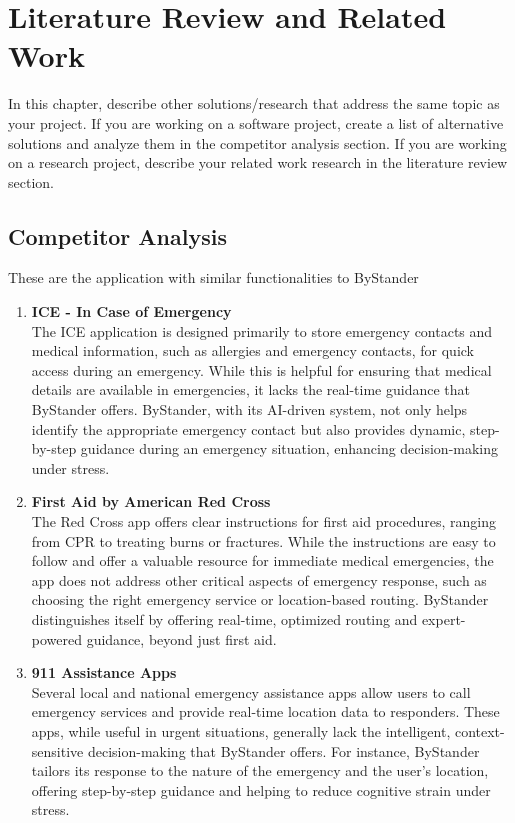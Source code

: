 \chapter{Literature Review and Related Work}
\label{chap:relatedworks}

In this chapter, describe other solutions/research that address the
same topic as your project. If you are working on a software project, create a
list of alternative solutions and analyze them in the competitor analysis section.
If you are working on a research project, describe your related work research in
the literature review section.

\section{Competitor Analysis}
\label{section:competitor-analysis}


These are the application with similar functionalities to ByStander

\begin{enumerate}
    \item \textbf{ICE - In Case of Emergency} \\
    The ICE application is designed primarily to store emergency contacts and medical information, such as allergies and emergency contacts, for quick access during an emergency. While this is helpful for ensuring that medical details are available in emergencies, it lacks the real-time guidance that ByStander offers. ByStander, with its AI-driven system, not only helps identify the appropriate emergency contact but also provides dynamic, step-by-step guidance during an emergency situation, enhancing decision-making under stress.    
    \item \textbf{First Aid by American Red Cross} \\
    The Red Cross app offers clear instructions for first aid procedures, ranging from CPR to treating burns or fractures. While the instructions are easy to follow and offer a valuable resource for immediate medical emergencies, the app does not address other critical aspects of emergency response, such as choosing the right emergency service or location-based routing. ByStander distinguishes itself by offering real-time, optimized routing and expert-powered guidance, beyond just first aid.
    \item \textbf{911 Assistance Apps} \\
    Several local and national emergency assistance apps allow users to call emergency services and provide real-time location data to responders. These apps, while useful in urgent situations, generally lack the intelligent, context-sensitive decision-making that ByStander offers. For instance, ByStander tailors its response to the nature of the emergency and the user’s location, offering step-by-step guidance and helping to reduce cognitive strain under stress.
\end{enumerate}

